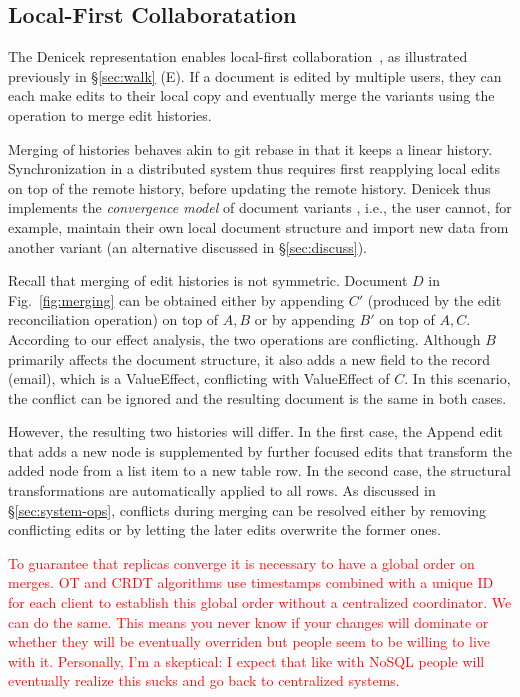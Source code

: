 \documentclass[sigconf,anonymous,screen]{acmart}
\newcommand{\ident}[1]{{\sffamily #1}}
\newcommand{\note}[1]{\textcolor{red}{#1}}
\begin{document}

\subsection{Local-First Collaboratation}
\label{sec:impl-collab}

The Denicek representation enables local-first collaboration~\cite{kleppmann-2019-local},
as illustrated previously in \S\ref{sec:walk} (E). If a document is edited by multiple users, they can
each make edits to their local copy and eventually merge the variants using the operation to
merge edit histories.

Merging of histories behaves akin to git rebase in that it keeps a linear history. Synchronization
in a distributed system thus requires first reapplying local edits on top of the remote history,
before updating the remote history. Denicek thus implements the \emph{convergence model} of
document variants \cite{edwards-2025-schema}, i.e., the user cannot, for example, maintain their
own local document structure and import new data from another variant (an alternative discussed
in \S\ref{sec:discuss}).

Recall that merging of edit histories is not symmetric. Document $D$ in Fig.~\ref{fig:merging}
can be obtained either by appending $C'$ (produced by the edit reconciliation operation)
on top of $A,B$ or by appending $B'$ on top of $A,C$. According to our effect analysis, the two
operations are conflicting. Although $B$ primarily affects the document structure, it also adds
a new field to the record (email), which is a \ident{ValueEffect}, conflicting with
\ident{ValueEffect} of $C$. In this scenario, the conflict can be ignored and the resulting document
is the same in both cases.

However, the resulting two histories will differ. In the first case, the
\ident{Append} edit that adds a new node is supplemented by further focused edits that transform
the added node from a list item to a new table row.
In the second case, the structural transformations are automatically applied to all rows.
As discussed in \S\ref{sec:system-ops}, conflicts during merging can be resolved either by
removing conflicting edits or by letting the later edits overwrite the former ones.

\note{To guarantee that replicas converge it is necessary to have a global order on merges. OT and CRDT algorithms use timestamps combined with a unique ID for each client to establish this global order without a centralized coordinator. We can do the same. This means you never know if your changes will dominate or whether they will be eventually overriden but people seem to be willing to live with it. Personally, I'm a skeptical: I expect that like with NoSQL people will eventually realize this sucks and go back to centralized systems.}
\end{document}
